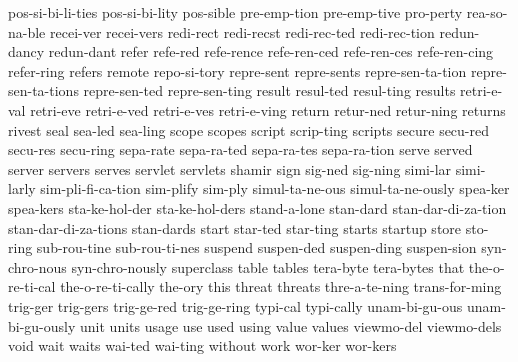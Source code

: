 {    pos-si-bi-li-ties
    pos-si-bi-lity
    pos-sible
    pre-emp-tion
    pre-emp-tive
    pro-perty
    rea-so-na-ble
    recei-ver
    recei-vers
    redi-rect
    redi-recst
    redi-rec-ted
    redi-rec-tion
    redun-dancy
    redun-dant
    refer
    refe-red
    refe-rence
    refe-ren-ced
    refe-ren-ces
    refe-ren-cing
    refer-ring
    refers
    remote
    repo-si-tory
    repre-sent
    repre-sents
    repre-sen-ta-tion
    repre-sen-ta-tions
    repre-sen-ted
    repre-sen-ting
    result
    resul-ted
    resul-ting
    results
    retri-e-val
    retri-eve
    retri-e-ved
    retri-e-ves
    retri-e-ving
    return
    retur-ned
    retur-ning
    returns
    rivest
    seal
    sea-led
    sea-ling
    scope
    scopes
    script
    scrip-ting
    scripts
    secure
    secu-red
    secu-res
    secu-ring
    sepa-rate
    sepa-ra-ted
    sepa-ra-tes
    sepa-ra-tion
    serve
    served
    server
    servers
    serves
    servlet
    servlets
    shamir
    sign
    sig-ned
    sig-ning
    simi-lar
    simi-larly
    sim-pli-fi-ca-tion
    sim-plify
    sim-ply
    simul-ta-ne-ous
    simul-ta-ne-ously
    spea-ker
    spea-kers
    sta-ke-hol-der
    sta-ke-hol-ders
    stand-a-lone
    stan-dard
    stan-dar-di-za-tion
    stan-dar-di-za-tions
    stan-dards
    start
    star-ted
    star-ting
    starts
    startup
    store
    sto-ring
    sub-rou-tine
    sub-rou-ti-nes
    suspend
    suspen-ded
    suspen-ding
    suspen-sion
    syn-chro-nous
    syn-chro-nously
    superclass
    table
    tables
    tera-byte
    tera-bytes
    that
    the-o-re-ti-cal
    the-o-re-ti-cally
    the-ory
    this
    threat
    threats
    thre-a-te-ning
    trans-for-ming
    trig-ger
    trig-gers
    trig-ge-red
    trig-ge-ring
    typi-cal
    typi-cally
    unam-bi-gu-ous
    unam-bi-gu-ously
    unit
    units
    usage
    use
    used
    using
    value
    values
    viewmo-del
    viewmo-dels
    void
    wait
    waits
    wai-ted
    wai-ting
    without
    work
    wor-ker
    wor-kers
}
